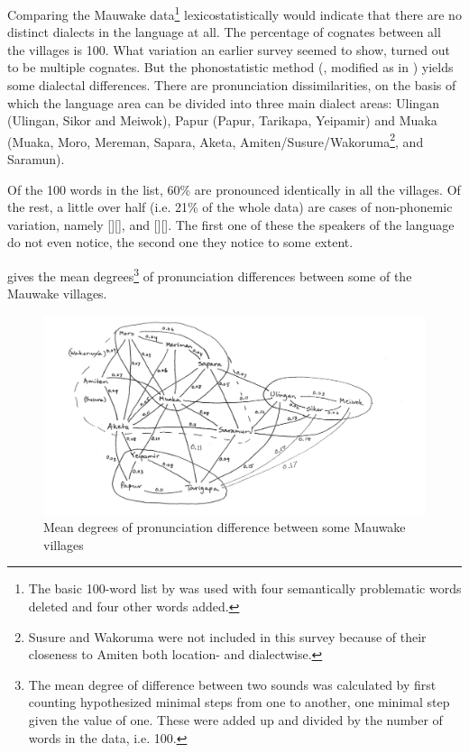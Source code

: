 Comparing the Mauwake data\footnote{The basic 100-word list by \citet[55--59]{Ezard1978} was used with four semantically problematic words deleted and four other words added.} lexicostatistically would indicate that there are no distinct dialects in the language at all. The percentage of cognates between all the villages is 100.  What variation an earlier survey seemed to show, turned out to be multiple cognates. But the phonostatistic method (\citealt{GrimesEtAl1959}, modified as in \citealt[177--178]{Simons1977}) yields some dialectal differences. There are pronunciation dissimilarities, on the basis of which the language area can be divided into three main dialect areas: Ulingan (Ulingan, Sikor and Meiwok), Papur (Papur, Tarikapa, Yeipamir) and Muaka (Muaka, Moro, Mereman, Sapara, Aketa, Amiten/Susure/Wakoruma\footnote{Susure and Wakoruma were not included in this survey because of their closeness to Amiten both location- and dialectwise.}, and Saramun). 

Of the 100 words in the list, 60\% are pronounced identically in all the villages.  Of the rest, a little over half (i.e. 21\% of the whole data) are cases of non-phonemic variation, namely []{\Tilde}[\emphs{$\beta$}], and []{\Tilde}[\emphs{{\textyogh}}]. The first one of these the speakers of the language do not even notice, the second one they notice to some extent. 

 gives the mean degrees\footnote{The mean degree of difference between two sounds was calculated by first counting hypothesized minimal steps from one to another, one minimal step given the value of one. These were added up and divided by the number of words in the data, i.e. 100.} of pronunciation differences between some of the Mauwake villages. 


\begin{figure}
\caption{Mean degrees of pronunciation difference between some Mauwake villages}
\label{map:5:pronunciationdiff}
\includegraphics[width=\textwidth]{figures/1-mean_degrees_of_pronounciation_difference_between_some_Mauwake_villages_map.jpeg}
\end{figure}

